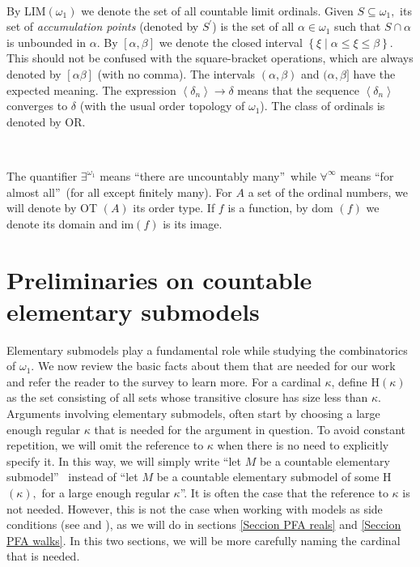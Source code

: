 \documentclass{article}
\begin{document}
\qquad\ \qquad\ \ \ 

By \textsf{LIM}$\left(  \omega_{1}\right)  $ we denote the set of all
countable limit ordinals. Given $S\subseteq\omega_{1},$ its set of
\emph{accumulation points }(denoted by $S^{\prime}$) is the set of all
$\alpha\in\omega_{1}$ such that $S\cap\alpha$ is unbounded in $\alpha$. By
$\left[  \alpha,\beta\right]  $ we denote the closed interval $\left\{
\xi\mid\alpha\leq\xi\leq\beta\right\}  .$ This should not be confused with the
square-bracket operations, which are always denoted by $\left[  \alpha
\beta\right]  $ (with no comma). The intervals $\left(  \alpha,\beta\right)  $
and $(\alpha,\beta]$ have the expected meaning. The expression $\left\langle
\delta_{n}\right\rangle \longrightarrow\delta$ means that the sequence
$\left\langle \delta_{n}\right\rangle $ converges to $\delta$ (with the usual
order topology of $\omega_{1}$). The class of ordinals is denoted by
\textsf{OR.}

\qquad\ \qquad\ \qquad\ \ \ 

The quantifier $\exists^{\omega_{1}}$ means \textquotedblleft there are
uncountably many\textquotedblright\ while $\forall^{\infty}$ means
\textquotedblleft for almost all\textquotedblright\ (for all except finitely
many). For $A$ a set of the ordinal numbers, we will denote by \textsf{OT}%
$\left(  A\right)  $ its order type. If $f$ is a function, by \textsf{dom}%
$\left(  f\right)  $ we denote its domain and \textsf{im}$\left(  f\right)  $
is its image.

\section{Preliminaries on countable elementary submodels}

Elementary submodels play a fundamental role while studying the combinatorics
of $\omega_{1}.$ We now review the basic facts about them that are needed for
our work and refer the reader to the survey \cite{AlanSubmodelos} to learn
more. For a cardinal $\kappa$, define \textsf{H}$\left(  \kappa\right)  $ as
the set consisting of all sets whose transitive closure has size less than
$\kappa.$ Arguments involving elementary submodels, often start by choosing a
large enough regular $\kappa$ that is needed for the argument in question. To
avoid constant repetition, we will omit the reference to $\kappa$ when there
is no need to explicitly specify it. In this way, we will simply write
\textquotedblleft let $M$ be a countable elementary submodel\textquotedblright%
\ instead of \textquotedblleft let $M$ be a countable elementary submodel of
some \textsf{H}$\left(  \kappa\right)  ,$ for a large enough regular $\kappa
$\textquotedblright. It is often the case that the reference to $\kappa$ is
not needed. However, this is not the case when working with models as side
conditions (see \cite{PartitionProblems} and \cite{NotesonForcingAxioms}), as
we will do in sections \ref{Seccion PFA reals} and \ref{Seccion PFA walks}. In
this two sections, we will be more carefully naming the cardinal that is needed.
\end{document}
